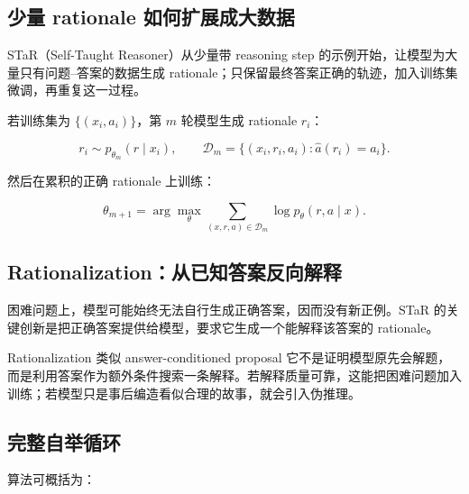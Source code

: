 \documentclass[a4paper]{article}
\begin{document}
\subsection{少量 rationale 如何扩展成大数据}

STaR（Self-Taught Reasoner）从少量带 reasoning step 的示例开始，让模型为大量只有问题--答案的数据生成 rationale；只保留最终答案正确的轨迹，加入训练集微调，再重复这一过程。


若训练集为 $\{(x_i,a_i)\}$，第 $m$ 轮模型生成 rationale $r_i$：

$$
r_i\sim p_{\theta_m}(r\mid x_i),\qquad
\mathcal D_m=\{(x_i,r_i,a_i):\hat a(r_i)=a_i\}.
$$

然后在累积的正确 rationale 上训练：

$$
\theta_{m+1}=\arg\max_\theta
\sum_{(x,r,a)\in\mathcal D_m}\log p_\theta(r,a\mid x).
$$

\subsection{Rationalization：从已知答案反向解释}

困难问题上，模型可能始终无法自行生成正确答案，因而没有新正例。STaR 的关键创新是把正确答案提供给模型，要求它生成一个能解释该答案的 rationale。


\begin{knowledgebox}{Rationalization 类似 answer-conditioned proposal}
它不是证明模型原先会解题，而是利用答案作为额外条件搜索一条解释。若解释质量可靠，这能把困难问题加入训练；若模型只是事后编造看似合理的故事，就会引入伪推理。
\end{knowledgebox}

\subsection{完整自举循环}



算法可概括为：
\end{document}
